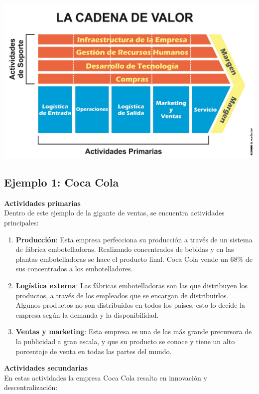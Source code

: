 \documentclass[12pt]{article}
\begin{document}
  \begin{center}
    {\includegraphics[width=0.75\linewidth]{Cadena_de_valor01.jpeg}\par}
  \end{center}

  \subsection{Ejemplo 1: Coca Cola}
  \textbf{Actividades primarias}\\

  Dentro de este ejemplo de la gigante de ventas, se encuentra actividades principales:
  \begin{enumerate}
    \item \textbf{Producción}: Esta empresa perfecciona su producción a través de un sistema
    de fábrica embotelladoras. Realizando concentrados de bebidas y en las plantas
    embotelladoras se hace el producto final. Coca Cola vende un 68\% de sus concentrados
    a los embotelladores.

    \item \textbf{Logística externa}: Las fábricas embotelladoras son las que distribuyen
    los productos, a través de los empleados que se encargan de distribuirlos. Algunos
    productos no son distribuidos en todos los países, esto lo decide la empresa según la 
    demanda y la disponibilidad.

    \item \textbf{Ventas y marketing}: Esta empresa es una de las más grande precursora de
    la publicidad a gran escala, y que su producto se conoce y tiene un alto porcentaje de 
    venta en todas las partes del mundo.
  \end{enumerate}

  \textbf{Actividades secundarias}\\
  En estas actividades la empresa Coca Cola resalta en innovación y descentralización:
\end{document}
